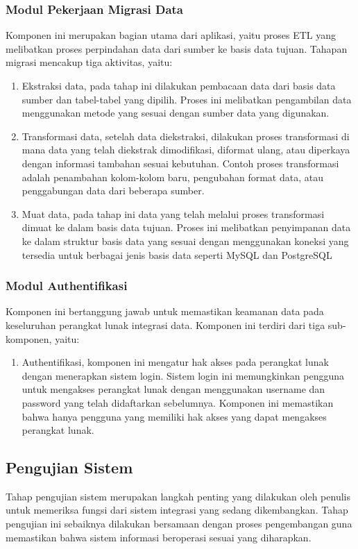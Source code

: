   \subsubsection{Modul Pekerjaan Migrasi Data}
  Komponen ini merupakan bagian utama dari aplikasi, yaitu proses ETL yang melibatkan proses perpindahan data dari sumber ke basis data tujuan. Tahapan migrasi mencakup tiga aktivitas, yaitu:
    \begin{enumerate}
      \item Ekstraksi data, pada tahap ini dilakukan pembacaan data dari basis data sumber dan tabel-tabel yang dipilih. Proses ini melibatkan pengambilan data menggunakan metode yang sesuai dengan sumber data yang digunakan.

      \item Transformasi data, setelah data diekstraksi, dilakukan proses transformasi di mana data yang telah diekstrak dimodifikasi, diformat ulang, atau diperkaya dengan informasi tambahan sesuai kebutuhan. Contoh proses transformasi adalah penambahan kolom-kolom baru, pengubahan format data, atau penggabungan data dari beberapa sumber.

      \item Muat data, pada tahap ini data yang telah melalui proses transformasi dimuat ke dalam basis data tujuan. Proses ini melibatkan penyimpanan data ke dalam struktur basis data yang sesuai dengan menggunakan koneksi yang tersedia untuk berbagai jenis basis data seperti MySQL dan PostgreSQL
    \end{enumerate}
  
    \subsubsection{Modul Authentifikasi}
    Komponen ini bertanggung jawab untuk memastikan keamanan data pada keseluruhan perangkat lunak integrasi data. Komponen ini terdiri dari tiga sub-komponen, yaitu:
    \begin{enumerate}
      \item Authentifikasi, komponen ini mengatur hak akses pada perangkat lunak dengan menerapkan sistem login. Sistem login ini memungkinkan pengguna untuk mengakses perangkat lunak dengan menggunakan username dan password yang telah didaftarkan sebelumnya. Komponen ini memastikan bahwa hanya pengguna yang memiliki hak akses yang dapat mengakses perangkat lunak.
    \end{enumerate}


\subsection{Pengujian Sistem}
Tahap pengujian sistem merupakan langkah penting yang dilakukan oleh penulis untuk memeriksa fungsi dari sistem integrasi yang sedang dikembangkan. Tahap pengujian ini sebaiknya dilakukan bersamaan dengan proses pengembangan guna memastikan bahwa sistem informasi beroperasi sesuai yang diharapkan.

